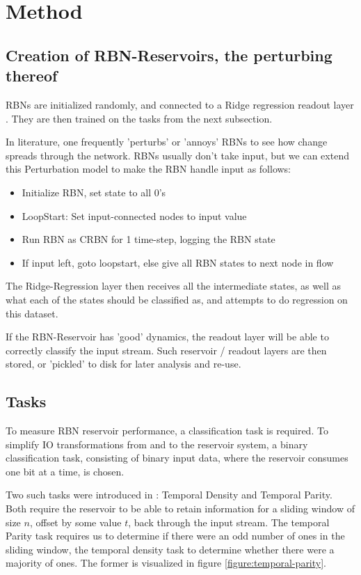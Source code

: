 \section{Method}

\subsection{Creation of RBN-Reservoirs, the perturbing thereof}

RBNs are initialized randomly, and connected to a Ridge regression readout layer \cite{WhatIsRidgeRegression?}.
They are then trained on the tasks from the next subsection.

In literature, one frequently 'perturbs' or 'annoys' RBNs to see how change spreads through the network. \cite{CitationMissing}
RBNs usually don't take input, but we can extend this Perturbation model to make the RBN handle input as follows:

\begin{itemize}
  \item Initialize RBN, set state to all 0's
  \item LoopStart: Set input-connected nodes to input value
  \item Run RBN as CRBN for 1 time-step, logging the RBN state
  \item If input left, goto loopstart, else give all RBN states to next node in flow
\end{itemize}

The Ridge-Regression layer then receives all the intermediate states, as well as what each of the states should be classified as, and attempts to do regression on this dataset.

If the RBN-Reservoir has 'good' dynamics,
the readout layer will be able to correctly classify the input stream.
Such reservoir / readout layers are then stored, or 'pickled' to disk for later analysis and re-use.

\subsection{Tasks}

To measure RBN reservoir performance, a classification task is required.
To simplify IO transformations from and to the reservoir system,
a binary classification task, consisting of binary input data,
where the reservoir consumes one bit at a time, is chosen.

Two such tasks were introduced in \cite{rbn-reservoir}: Temporal Density and Temporal Parity.
Both require the reservoir to be able to retain information for a sliding window of size $ n $,
offset by some value $ t $, back through the input stream.
The temporal Parity task requires us to determine if there were an odd number of ones in the sliding window,
the temporal density task to determine whether there were a majority of ones.
The former is visualized in figure \ref{figure:temporal-parity}.

